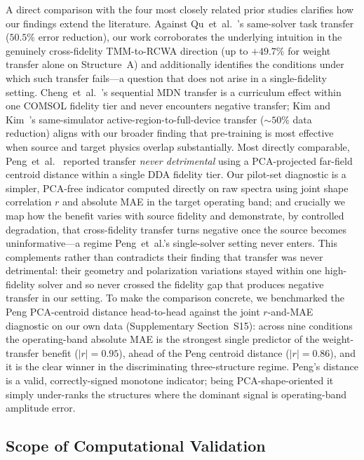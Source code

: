 \documentclass[a4paper,fleqn]{cas-sc}
\begin{document}
A direct comparison with the four most closely related prior studies clarifies how our findings extend the literature. Against Qu~et~al.~\cite{qu2019migrating}'s same-solver task transfer ($50.5\%$ error reduction), our work corroborates the underlying intuition in the genuinely cross-fidelity TMM-to-RCWA direction (up to $+49.7\%$ for weight transfer alone on Structure~A) and additionally identifies the conditions under which such transfer fails---a question that does not arise in a single-fidelity setting. Cheng~et~al.~\cite{chen2024tl_mdn}'s sequential MDN transfer is a curriculum effect within one COMSOL fidelity tier and never encounters negative transfer; Kim and Kim~\cite{kim2025pbtl}'s same-simulator active-region-to-full-device transfer (${\sim}50\%$ data reduction) aligns with our broader finding that pre-training is most effective when source and target physics overlap substantially. Most directly comparable, Peng~et~al.~\cite{peng2024nanophotonics} reported transfer \emph{never detrimental} using a PCA-projected far-field centroid distance within a single DDA fidelity tier. Our pilot-set diagnostic is a simpler, PCA-free indicator computed directly on raw spectra using joint shape correlation $r$ and absolute MAE in the target operating band; and crucially we map how the benefit varies with source fidelity and demonstrate, by controlled degradation, that cross-fidelity transfer turns negative once the source becomes uninformative---a regime Peng~et~al.'s single-solver setting never enters. This complements rather than contradicts their finding that transfer was never detrimental: their geometry and polarization variations stayed within one high-fidelity solver and so never crossed the fidelity gap that produces negative transfer in our setting. To make the comparison concrete, we benchmarked the Peng PCA-centroid distance head-to-head against the joint $r$-and-MAE diagnostic on our own data (Supplementary Section~S15): across nine conditions the operating-band absolute MAE is the strongest single predictor of the weight-transfer benefit ($|r|=0.95$), ahead of the Peng centroid distance ($|r|=0.86$), and it is the clear winner in the discriminating three-structure regime. Peng's distance is a valid, correctly-signed monotone indicator; being PCA-shape-oriented it simply under-ranks the structures where the dominant signal is operating-band amplitude error.

\subsection{Scope of Computational Validation}
\end{document}
